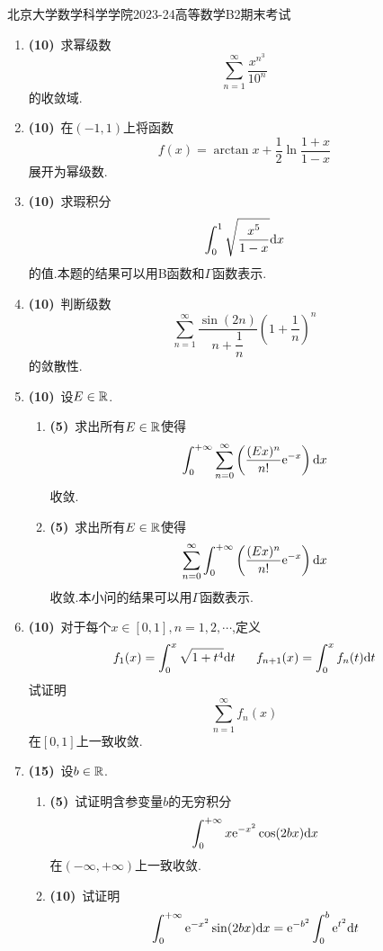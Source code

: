 \documentclass{ctexart}
\begin{document}
\pagestyle{empty}
\begin{center}\Large
    北京大学数学科学学院2023-24高等数学B2期末考试
\end{center}
\begin{enumerate}[leftmargin=*,label=\textbf{\arabic*.},topsep=0pt,parsep=0pt,itemsep=0pt,partopsep=0pt]
    \item \textbf{(10)}\ 求幂级数
        \[\sum_{n=1}^{\infty}\dfrac{x^{n^3}}{10^n}\]
        的收敛域.

    \item \textbf{(10)}\ 在$(-1,1)$上将函数
        \[f(x)=\arctan x+\dfrac12\ln\dfrac{1+x}{1-x}\]
        展开为幂级数.

    \item \textbf{(10)}\ 求瑕积分
        \[\int_0^1\sqrt{\dfrac{x^5}{1-x}}\mathrm{d} x\]
        的值.本题的结果可以用B函数和$\Gamma$函数表示.

    \item \textbf{(10)}\ 判断级数
        \[\sum_{n=1}^{\infty}\dfrac{\sin(2n)}{n+\dfrac1n}\left(1+\dfrac1n\right)^n\]
        的敛散性.
        
    \item \textbf{(10)}\ 设$E\in\mathbb{R}$.
        \begin{enumerate}[label=\tbf{(\arabic*)},topsep=0pt,parsep=0pt,itemsep=0pt,partopsep=0pt]
            \item \textbf{(5)}\ 求出所有$E\in\mathbb{R}$使得
                \[\int_0^{+\infty}\sum_{n=0}^{\infty}\left(\dfrac{(Ex)^n}{n!}\mathrm{e}^{-x}\right)\mathrm{d} x\]
                收敛.
            \item \textbf{(5)}\ 求出所有$E\in\mathbb{R}$使得
                \[\sum_{n=0}^{\infty}\int_0^{+\infty}\left(\dfrac{(Ex)^n}{n!}\mathrm{e}^{-x}\right)\mathrm{d} x\]
                收敛.本小问的结果可以用$\Gamma$函数表示.
        \end{enumerate}

    \item \textbf{(10)}\ 对于每个$x\in[0,1],n=1,2,\cdots$,定义
        \[f_1(x)=\int_0^x\sqrt{1+t^4}\di t\ \ \ \ \ f_{n+1}(x)=\int_0^xf_n(t)\di t\]
        试证明
        \[\sum_{n=1}^{\infty}f_n(x)\]
        在$[0,1]$上一致收敛.

    \item \textbf{(15)}\ 设$b\in\mathbb{R}$.
        \begin{enumerate}[label=\tbf{(\arabic*)},topsep=0pt,parsep=0pt,itemsep=0pt,partopsep=0pt]
            \item \textbf{(5)}\ 试证明含参变量$b$的无穷积分
                \[\int_0^{+\infty}x\mathrm{e}^{-x^2}\cos(2bx)\mathrm{d} x\]
                在$(-\infty,+\infty)$上一致收敛.
            \item \textbf{(10)}\ 试证明
                \[\int_0^{+\infty}\mathrm{e}^{-x^2}\sin(2bx)\mathrm{d} x=\mathrm{e}^{-b^2}\int_0^b\mathrm{e}^{t^2}\mathrm{d} t\]
        \end{enumerate}


\end{enumerate}
\end{document}
